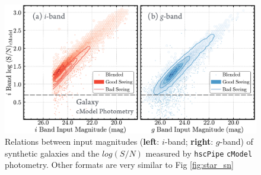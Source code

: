 \documentclass[useamsfonts]{pasj01}
\def\hscpipe{\texttt{hscPipe}}
\def\cmodel{\texttt{cModel}}
\begin{document}

\begin{figure}
    \begin{center}
        \includegraphics[width=\textwidth]{fig/synpipe_galaxy_sn}
    \end{center}
    \caption{
        Relations between input magnitudes (\textbf{left}: $i$-band; \textbf{right}: 
        $g$-band) of synthetic galaxies and the $log(S/N)$ measured by \hscpipe{}
        \cmodel{} photometry.  
        Other formats are very similar to Fig \ref{fig:star_sn}
        }
    \label{fig:cmodel_sn}
\end{figure}
\end{document}
